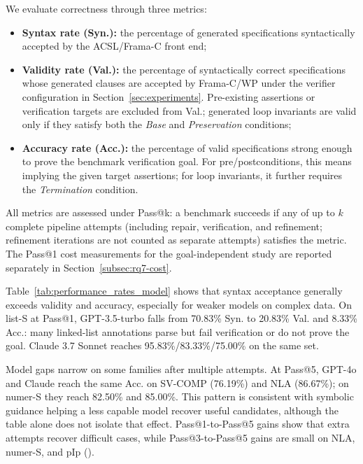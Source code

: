 We evaluate correctness through three metrics:
\begin{itemize}
\item \textbf{Syntax rate (Syn.):} the percentage of generated specifications
syntactically accepted by the ACSL/Frama-C front end;
\item \textbf{Validity rate (Val.):} the percentage of syntactically correct
specifications whose generated clauses are accepted by Frama-C/WP under the
verifier configuration in Section~\ref{sec:experiments}. Pre-existing assertions
or verification targets are excluded from Val.; generated loop invariants are
valid only if they satisfy both the \textit{Base} and \textit{Preservation}
conditions;
\item \textbf{Accuracy rate (Acc.):} the percentage of valid specifications
strong enough to prove the benchmark verification goal. For pre/postconditions,
this means implying the given target assertions; for loop invariants, it further
requires the \textit{Termination} condition.
\end{itemize}
All metrics are assessed under Pass@k: a benchmark succeeds if any of up to $k$
complete pipeline attempts (including repair, verification, and refinement;
refinement iterations are not counted as separate attempts) satisfies the metric.
The Pass@1 cost measurements for the goal-independent study are reported
separately in Section~\ref{subsec:rq7-cost}.











Table~\ref{tab:performance_rates_model} shows that syntax acceptance
generally exceeds validity and accuracy, especially for weaker models on
complex data. On list-S at Pass@1, GPT-3.5-turbo falls from 70.83\% Syn. to
20.83\% Val. and 8.33\% Acc.: many linked-list annotations parse but fail
verification or do not prove the goal. Claude 3.7 Sonnet reaches
95.83\%/83.33\%/75.00\% on the same set.

Model gaps narrow on some families after multiple attempts. At Pass@5,
GPT-4o and Claude reach the same Acc. on SV-COMP (76.19\%) and NLA
(86.67\%); on numer-S they reach 82.50\% and 85.00\%. This pattern is
consistent with symbolic guidance helping a less capable model recover
useful candidates, although the table alone does not isolate that effect.
Pass@1-to-Pass@5 gains show that extra attempts recover difficult cases,
while Pass@3-to-Pass@5 gains are small on NLA, numer-S, and pIp
().

